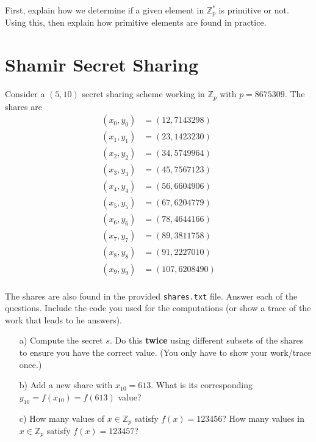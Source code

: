 \documentclass[12pt, letterpaper]{article}
\newcommand{\ZZ}{\ensuremath{\mathbb{Z}}}
\newcommand{\code}[1]{\texttt{#1}}
\begin{document}
First, explain how we determine if a given element in $\mathbb{Z}_p^*$ is primitive or not. 
Using this, then explain how primitive elements are found in practice. 

\newpage

\section{Shamir Secret Sharing}

Consider a $(5,10)$ secret sharing scheme working in $\ZZ_p$ with $p=8675309$.
The shares are 
\begin{align*}
(x_{0}, y_{0}) &= (12, 7143298)\\
(x_{1}, y_{1}) &= (23, 1423230)\\
(x_{2}, y_{2}) &= (34, 5749964)\\
(x_{3}, y_{3}) &= (45, 7567123)\\
(x_{4}, y_{4}) &= (56, 6604906)\\
(x_{5}, y_{5}) &= (67, 6204779)\\
(x_{6}, y_{6}) &= (78, 4644166)\\
(x_{7}, y_{7}) &= (89, 3811758)\\
(x_{8}, y_{8}) &= (91, 2227010)\\
(x_{9}, y_{9}) &= (107, 6208490)\\
\end{align*}

The shares are also found in the provided \code{shares.txt} file.
Answer each of the questions. Include the code you used for the computations (or show a trace of the work
that leads to he answers).

\begin{itemize}
\item[a)] Compute the secret $s$. Do this \textbf{twice} using different subsets of the shares to ensure you have the correct value. (You only have to show your work/trace once.)


\item[b)] Add a new share with $x_{10} = 613$. What is its corresponding $y_{10} = f(x_{10}) = f(613)$ value?



\item[c)] How many values of $x \in \ZZ_p$ satisfy $f(x) = 123456$? How many values in $x \in \ZZ_p$ satisfy $f(x)=123457$?



\end{itemize}






\end{document}

